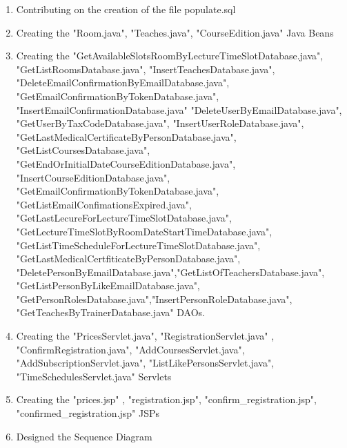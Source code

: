 \begin{description}
		\begin{enumerate}
		\item Contributing on the creation of the file populate.sql
		\item Creating the "Room.java", "Teaches.java", "CourseEdition.java" Java Beans
		\item Creating the "GetAvailableSlotsRoomByLectureTimeSlotDatabase.java", "GetListRoomsDatabase.java", "InsertTeachesDatabase.java", 	"DeleteEmailConfirmationByEmailDatabase.java", "GetEmailConfirmationByTokenDatabase.java", "InsertEmailConfirmationDatabase.java" "DeleteUserByEmailDatabase.java", "GetUserByTaxCodeDatabase.java", "InsertUserRoleDatabase.java", "GetLastMedicalCertificateByPersonDatabase.java", "GetListCoursesDatabase.java", "GetEndOrInitialDateCourseEditionDatabase.java", "InsertCourseEditionDatabase.java", "GetEmailConfirmationByTokenDatabase.java", "GetListEmailConfimationsExpired.java", "GetLastLecureForLectureTimeSlotDatabase.java", "GetLectureTimeSlotByRoomDateStartTimeDatabase.java", "GetListTimeScheduleForLectureTimeSlotDatabase.java", "GetLastMedicalCertfiticateByPersonDatabase.java", "DeletePersonByEmailDatabase.java","GetListOfTeachersDatabase.java", "GetListPersonByLikeEmailDatabase.java", "GetPersonRolesDatabase.java","InsertPersonRoleDatabase.java", "GetTeachesByTrainerDatabase.java" DAOs.
		\item Creating the "PricesServlet.java", "RegistrationServlet.java" , "ConfirmRegistration.java", "AddCoursesServlet.java", "AddSubscriptionServlet.java", "ListLikePersonsServlet.java", "TimeSchedulesServlet.java" Servlets
		\item Creating the "prices.jsp" , "registration.jsp", "confirm\_registration.jsp", "confirmed\_registration.jsp" JSPs	
		\item Designed the Sequence Diagram		
			
		\end{enumerate}


\end{description}
